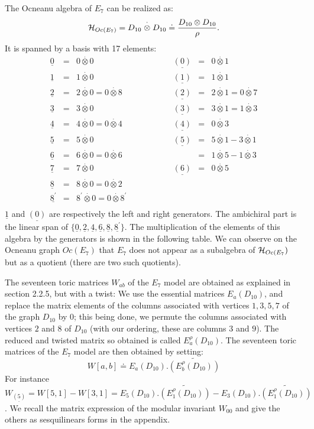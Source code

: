 \documentclass[a4paper,11pt]{article}
\def \otimesdot {\stackrel{\cdot}{\otimes}}
\newcommand{\ud}[1]{\underline{#1}}
\begin{document}
The Ocneanu algebra of $E_7$ can be realized as:
$$
{\cal{H}}_{Oc(E_7)}= D_{10} \otimesdot D_{10} \doteq
\frac{D_{10} \otimes D_{10}}{\rho}.
$$
It is spanned by a basis with 17 elements:
$$
\begin{array}{cclcccl}
\ud0 &=& 0 \otimesdot 0  & \qquad \qquad & \ud{(0)} &=& 0 \otimesdot 1   \\
\ud1 &=& 1 \otimesdot 0  & \qquad \qquad & \ud{(1)} &=& 1 \otimesdot 1   \\
\ud2 &=& 2 \otimesdot 0 = 0 \otimesdot 8 & \qquad \qquad & \ud{(2)} &=& 2
\otimesdot 1 = 0 \otimesdot 7  \\
\ud3 &=& 3 \otimesdot 0  & \qquad \qquad & \ud{(3)} &=& 3 \otimesdot 1 = 1
\otimesdot 3  \\
\ud4 &=& 4 \otimesdot 0 = 0 \otimesdot 4 & \qquad \qquad & \ud{(4)} &=& 0
\otimesdot 3   \\
\ud5 &=& 5 \otimesdot 0  & \qquad \qquad & \ud{(5)} &=& 5 \otimesdot 1 - 3
\otimesdot 1  \\
\ud6 &=& 6 \otimesdot 0 = 0 \otimesdot 6 & \qquad \qquad & &=&1 \otimesdot 5 -
1 \otimesdot 3   \\
\ud7 &=& 7 \otimesdot 0  & \qquad \qquad & \ud{(6)} &=& 0 \otimesdot 5   \\
\ud8 &=& 8 \otimesdot 0 = 0 \otimesdot 2 & \qquad \qquad & & &   \\
\ud{8^{'}} &=& 8^{'} \otimesdot 0 = 0 \otimesdot 8^{'} & \qquad
\qquad & & &   \\
\end{array}
$$
$\ud1$ and $\ud{(0)}$ are respectively the left and right generators.
The ambichiral part is the linear span of
$\{\ud{0},\ud{2},\ud{4},\ud{6},\ud{8},\ud{8^{'}}\}$.
The multiplication of the elements of this algebra by the generators
is shown in the following table.
We can observe on the Ocneanu graph $Oc(E_{7})$ that $E_7$
does not appear as a subalgebra of ${\cal H}_{Oc(E_{7}})$
but as a quotient (there are two such quotients).

The seventeen toric matrices $W_{ab}$ of the $E_{7}$ model are obtained
as explained in section 2.2.5, but with a twist: We use the essential
matrices $E_{a}(D_{10})$, and replace the matrix elements of the
columns associated with
vertices $1,3,5,7$ of the graph $D_{10}$ by $0$; this being done, we
permute the columns associated with vertices $2$ and $8$ of $D_{10}$
(with our ordering, these are columns $3$ and $9$). The reduced and twisted
matrix so obtained is called $E_{a}^{\rho}(D_{10})$.
The seventeen toric matrices of the $E_{7}$ model are then obtained by setting:
$$
W[a,b] \doteq E_a(D_{10}) . \widetilde{ (E_b^{\rho}(D_{10}))}
$$
For instance $W_{\ud{(5)}}=  W[5,1] - W[3,1] = E_5(D_{10}) .
\widetilde{ (E_1^{\rho}(D_{10}))}
- E_3(D_{10}) . \widetilde{ (E_1^{\rho}(D_{10}))}$.
We recall the matrix expression of the modular invariant $W_{00}$ and give
the others as sesquilinears forms in the appendix.
\end{document}
